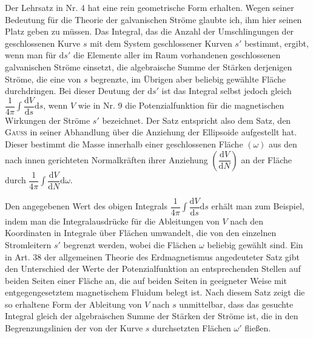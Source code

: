 Der Lehrsatz in Nr. 4 hat eine rein geometrische Form erhalten. Wegen seiner Bedeutung für die Theorie der galvanischen Ströme glaubte ich, ihm hier seinen Platz geben zu müssen. Das Integral, das die Anzahl der Umschlingungen der geschlossenen Kurve $s$ mit dem System geschlossener Kurven $s'$ bestimmt, ergibt, wenn man für $\mathrm ds'$ die Elemente aller im Raum vorhandenen geschlossenen galvanischen Ströme einsetzt, die algebraische Summe der Stärken derjenigen Ströme, die eine von $s$ begrenzte, im Übrigen aber beliebig gewählte Fläche durchdringen. Bei dieser Deutung der $\mathrm ds'$ ist das Integral selbst jedoch gleich $\dfrac1{4\pi}\int\dfrac{\mathrm dV}{\mathrm ds}\mathrm ds$, wenn $V$ wie in Nr. 9 die Potenzialfunktion für die magnetischen Wirkungen der Ströme $s'$ bezeichnet. Der Satz entspricht also dem Satz, den \textsc{Gauss} in seiner Abhandlung über die Anziehung der Ellipsoide aufgestellt hat. Dieser bestimmt die Masse innerhalb einer geschlossenen Fläche $(\omega)$ aus den nach innen gerichteten Normalkräften ihrer Anziehung $\left(\dfrac{\mathrm dV}{\mathrm dN}\right)$ an der Fläche durch $\dfrac1{4\pi}\int\dfrac{\mathrm dV}{\mathrm dN}\mathrm d\omega$.

Den angegebenen Wert des obigen Integrals $\dfrac1{4\pi}\allowbreak\int\dfrac{\mathrm dV}{\mathrm ds}\mathrm ds$ erhält man zum Beispiel, indem man die Integralausdrücke für die Ableitungen von $V$ nach den Koordinaten in Integrale über Flächen umwandelt, die von den einzelnen Stromleitern $s'$ begrenzt werden, wobei die Flächen $\omega$ beliebig gewählt sind. Ein in Art. 38 der allgemeinen Theorie des Erdmagnetismus angedeuteter Satz gibt den Unterschied der Werte der Potenzialfunktion an entsprechenden Stellen auf beiden Seiten einer Fläche an, die auf beiden Seiten in geeigneter Weise mit entgegengesetztem magnetischem Fluidum belegt ist. Nach diesem Satz zeigt die so erhaltene Form der Ableitung von $V$ nach $s$ unmittelbar, dass das gesuchte Integral gleich der algebraischen Summe der Stärken der Ströme ist, die in den Begrenzungslinien der von der Kurve $s$ durchsetzten Flächen $\omega'$ fließen.

